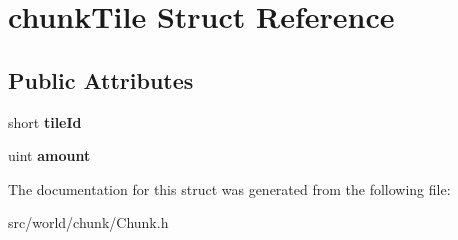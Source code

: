 \hypertarget{structchunkTile}{\section{chunk\-Tile Struct Reference}
\label{structchunkTile}
}
\subsection*{Public Attributes}
\begin{DoxyCompactItemize}
\item 
\hypertarget{structchunkTile_a74b2c3696dc0561da8e9891d214bb27b}{short {\bfseries tile\-Id}}\label{structchunkTile_a74b2c3696dc0561da8e9891d214bb27b}

\item 
\hypertarget{structchunkTile_a17a4618472b34064e44b9ac3ebf36b18}{uint {\bfseries amount}}\label{structchunkTile_a17a4618472b34064e44b9ac3ebf36b18}

\end{DoxyCompactItemize}


The documentation for this struct was generated from the following file\-:\begin{DoxyCompactItemize}
\item 
src/world/chunk/Chunk.\-h\end{DoxyCompactItemize}
